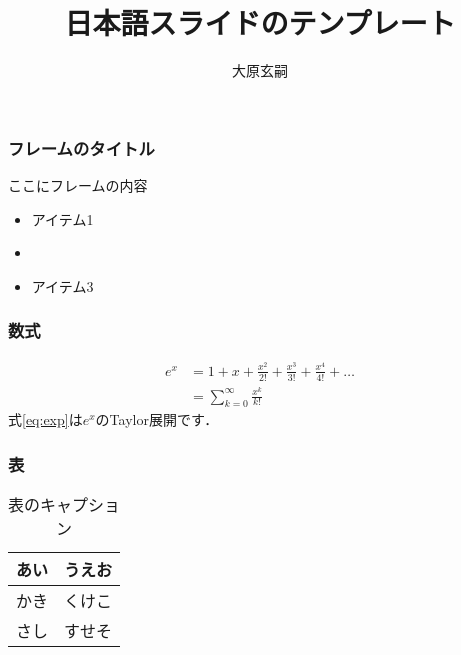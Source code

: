 \documentclass{slide-ja}
\title{日本語スライドのテンプレート}
\author{大原玄嗣}
\begin{document}
{%
\vfuzz=15.63992pt
\maketitle
}

\begin{frame}
	\frametitle{フレームのタイトル}
	ここにフレームの内容
	\begin{itemize}
		\item アイテム1
		\item {}
		\item アイテム3
	\end{itemize}
\end{frame}

\begin{frame}
	\frametitle{数式}
	\begin{align}
		\label{eq:exp}
		e^x & = 1 + x + \frac{x^2}{2!} + \frac{x^3}{3!} + \frac{x^4}{4!} + \ldots \\
		    & =\sum_{k=0}^\infty \frac{x^k}{k!}
	\end{align}
	式\eqref{eq:exp}は$e^x$のTaylor展開です．

\end{frame}

\begin{frame}
	\frametitle{表}
	\begin{table}
		\caption{表のキャプション}
		\begin{tabular}{ll}
			\toprule
			あい & うえお \\
			\midrule
			かき & くけこ \\
			さし & すせそ \\
			\bottomrule
		\end{tabular}
	\end{table}
\end{frame}
\end{document}
